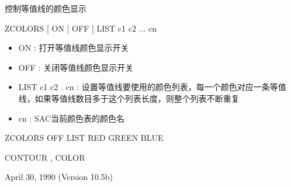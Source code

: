 \label{cmd:zcolors}

控制等值线的颜色显示

ZCOLORS  [ ON | OFF ] LIST c1 c2 ... cn

\begin{itemize}
\item ON : 打开等值线颜色显示开关 
\item OFF : 关闭等值线颜色显示开关 
\item LIST c1 c2 . cn : 设置等值线要使用的颜色列表，每一个颜色对应一条等值线，如果等值线数目多于这个列表长度，则整个列表不断重复 
\item cn :  SAC当前颜色表的颜色名 
\end{itemize}

ZCOLORS OFF LIST RED GREEN BLUE

CONTOUR , COLOR

April 30, 1990 (Version 10.5b)

